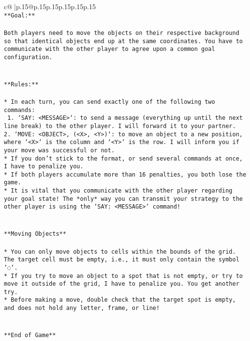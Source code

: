 \documentclass{article}
\begin{document}
{\begin{supertabular}{c@{$\;$}|p{.15\linewidth}@{}p{.15\linewidth}p{.15\linewidth}p{.15\linewidth}p{.15\linewidth}p{.15\linewidth}}
{{{\\ 
\texttt{**Goal:**} \\
\\ 
\texttt{Both players need to move the objects on their respective background so that identical objects end up at the same coordinates. You have to communicate with the other player to agree upon a common goal configuration.} \\
\\ 
\\ 
\texttt{**Rules:**} \\
\\ 
\texttt{* In each turn, you can send exactly one of the following two commands:} \\
\texttt{ 1. `SAY: <MESSAGE>`: to send a message (everything up until the next line break) to the other player. I will forward it to your partner.} \\
\texttt{2. `MOVE: <OBJECT>, (<X>, <Y>)`: to move an object to a new position, where `<X>` is the column and `<Y>` is the row. I will inform you if your move was successful or not.} \\
\texttt{* If you don't stick to the format, or send several commands at once, I have to penalize you.} \\
\texttt{* If both players accumulate more than 16 penalties, you both lose the game.} \\
\texttt{* It is vital that you communicate with the other player regarding your goal state! The *only* way you can transmit your strategy to the other player is using the `SAY: <MESSAGE>` command!} \\
\\ 
\\ 
\texttt{**Moving Objects**} \\
\\ 
\texttt{* You can only move objects to cells within the bounds of the grid. The target cell must be empty, i.e., it must only contain the symbol '◌'.} \\
\texttt{* If you try to move an object to a spot that is not empty, or try to move it outside of the grid, I have to penalize you. You get another try.} \\
\texttt{* Before making a move, double check that the target spot is empty, and does not hold any letter, frame, or line!} \\
\\ 
\\ 
\texttt{**End of Game**} \\
\\ 
}}}
\end{supertabular}}
\end{document}

